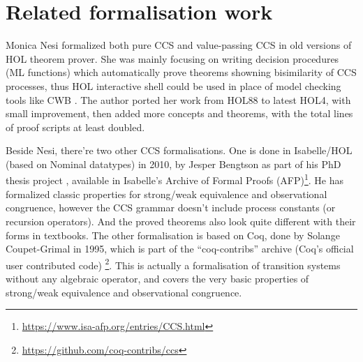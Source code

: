 \section{Related formalisation work}

Monica Nesi formalized both pure CCS \cite{Nesi:1992ve} and value-passing CCS
\cite{Nesi:2017wo} in old versions of HOL theorem prover.
She was mainly focusing on writing decision procedures (ML functions) which
automatically prove theorems showning bisimilarity of CCS processes,
thus HOL interactive shell could be used in
place of model checking tools like CWB
\cite{cleaveland1993concurrency}. The author ported her work from
HOL88 to latest HOL4, with small improvement, then added more concepts
and theorems, with the total lines of proof scripts at least doubled.

Beside Nesi, there're two other CCS formalisations. One
is done in Isabelle/HOL (based on Nominal datatypes) in 2010, by Jesper Bengtson as part of his PhD
thesis project \cite{bengtson2010formalising}, available in Isabelle's Archive of Formal
Proofs (AFP)\footnote{\url{https://www.isa-afp.org/entries/CCS.html}}. He has formalized
classic properties for strong/weak equivalence and observational
congruence, however the CCS grammar doesn't include process constants
(or recursion operators). And the proved theorems also look quite
different with their forms in textbooks.
The other formalisation is based on Coq, done by Solange
Coupet-Grimal in 1995, which is part of the
``coq-contribs'' archive (Coq's official user contributed code)
\footnote{\url{https://github.com/coq-contribs/ccs}}. This is actually
a formalisation of transition systems without any algebraic operator,
and covers the very basic properties of strong/weak equivalence and observational
congruence.
